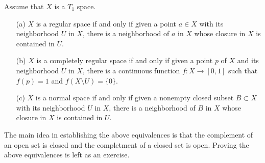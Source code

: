 \begin{rmk}
    Assume that $X$ is a $T_1$ space.
    \begin{enumerate}
        \item[(a)]
        {
            $X$ is a regular space if and only if given a point $a\in X$ with its neighborhood $U$ in $X$, there is a neighborhood of $a$ in $X$ whose closure in $X$ is contained in $U$.
        }
        \item[(b)]
        {
            $X$ is a completely regular space if and only if given a point $p$ of $X$ and its neighborhood $U$ in $X$, there is a continuous function $f: X\rightarrow[0, 1]$ such that $f(p)=1$ and $f(X\setminus U)=\{0\}$.
        }
        \item[(c)]
        {
            $X$ is a normal space if and only if given a nonempty closed subset $B\subset X$ with its neighborhood $U$ in $X$, there is a neighborhood of $B$ in $X$ whose closure in $X$ is contained in $U$.
        }
    \end{enumerate}
    The main idea in establishing the above equivalences is that the complement of an open set is closed and the completment of a closed set is open.
    \color{brown}Proving the above equivalences is left as an exercise.\color{black}
\end{rmk}

